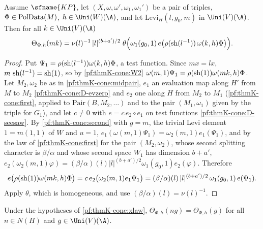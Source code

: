 \begin{lemma}\label{pf:thmK-cone:xlaw}
Assume $\sfname{KP}$, let $(X,\omega,\omega',\omega_1,\omega_1')$ be a pair of triples, $\Phi\in\operatorname{PolData}(M)$,
$h\in\Uni(W)(\A)$, and let $\mathrm{Levi}_H(l,g_0,m)$ in $\Uni(V)(\A)$.  Then for all $k\in\Uni(V)(\A)$
\[
  \Theta_{\Phi,h}(mk)=\nu(l)^{-1}\,|l|^{(b+a')/2}\;
  \theta\Bigl(\omega_1(g_0,1)\,e\bigl(\rho(\operatorname{sh}(l^{-1}))\,\omega(k,h)\Phi\bigr)\Bigr).
\]
\end{lemma}

\begin{proof}
Put $\Psi_1=\rho(\operatorname{sh}(l^{-1}))\omega(k,h)\Phi$, a test function.  Since $mx=lx$, $m\,\operatorname{sh}(l^{-1})=
\operatorname{sh}(1)$, so by \ref{pf:thmK-cone:W2} $\omega(m,1)\Psi_1=\rho(\operatorname{sh}(1))\omega(mk,h)\Phi$.  Let $M_2,\omega_2$
be as in \cref{pf:thmK-cone:midpair}, $e_1$ an evaluation map along $H'$ from $M$ to $M_2$ \ref{pf:thmK-cone:D-evzero}
and $e_2$ one along $H$ from $M_2$ to $M_1$ (\cref{pf:thmK-cone:first}, applied to $\mathrm{Pair}(B,M_2,\dots)$ and to
the pair $(M_1,\omega_1)$ given by the triple for $G_1$), and let $c\neq0$ with $e=c\,e_2\circ e_1$ on test functions
\ref{pf:thmK-cone:D-seesaw}.  By \cref{pf:thmK-cone:second} with $g=m$, the trivial Levi element $1=m(1,1)$ of $W$ and
$u=1$, $e_1(\omega(m,1)\Psi_1)=\omega_2(m,1)e_1(\Psi_1)$, and by the law of \cref{pf:thmK-cone:first} for the pair
$(M_2,\omega_2)$, whose second splitting character is $\beta/\alpha$ and whose second space $W_1$ has dimension $b+a'$,
$e_2(\omega_2(m,1)\varphi)=(\beta/\alpha)(l)|l|^{(b+a')/2}\omega_1(g_0,1)e_2(\varphi)$.  Therefore
\[
  e\bigl(\rho(\operatorname{sh}(1))\omega(mk,h)\Phi\bigr)=c\,e_2\bigl(\omega_2(m,1)e_1\Psi_1\bigr)
  =(\beta/\alpha)(l)\,|l|^{(b+a')/2}\,\omega_1(g_0,1)\,e(\Psi_1).
\]
Apply $\theta$, which is homogeneous, and use $(\beta/\alpha)(l)=\nu(l)^{-1}$.
\end{proof}

\begin{lemma}\label{pf:thmK-cone:xNinv}
Under the hypotheses of \cref{pf:thmK-cone:xlaw}, $\Theta_{\Phi,h}(ng)=\Theta_{\Phi,h}(g)$ for all $n\in N(H)$ and
$g\in\Uni(V)(\A)$.
\end{lemma}

